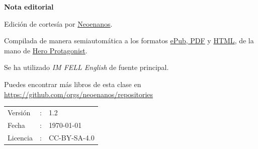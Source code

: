 \begin{center}
  {\LARGE\textbf{Nota editorial}}
\end{center}

\bigskip

Edición de cortesía por \href{https://github.com/orgs/neoenanos/}{Neoenanos}.

\medskip

Compilada de manera semiautomática a los formatos \href{https://github.com/neoenanos/elella/releases}{ePub, PDF} y \href{https://elella.netlify.app}{HTML}, de la mano de \href{https://heroprotagonist.is-a.dev/}{Hero Protagonist}.

\medskip

Se ha utilizado {\it IM FELL English} de fuente principal.

\medskip

Puedes encontrar más libros de esta clase en\\
\url{https://github.com/orgs/neoenanos/repositories}

\vfill

\begin{tabular}{l l l}
Versión   & : & 1.2 \\
Fecha     & : & \today \\
Licencia  & : & CC-BY-SA-4.0 \\
\end{tabular}

\bigskip

